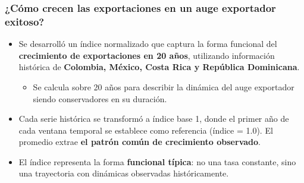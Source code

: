 \documentclass[aspectratio=169,xcolor=dvipsnames]{beamer}
\begin{document}
\begin{frame}
\frametitle{¿Cómo crecen las exportaciones en un auge exportador exitoso?}

\vspace{0.3cm}
\begin{itemize}
    \item Se desarrolló un índice normalizado que captura la forma funcional del \textbf{crecimiento de exportaciones en 20 años}, utilizando información histórica de \textbf{Colombia, México, Costa Rica y República Dominicana}.
    \begin{itemize}
        \item Se calcula sobre 20 años para describir la dinámica del auge exportador siendo conservadores en su duración.
    \end{itemize}
    \item Cada serie histórica se transformó a índice base 1, donde el primer año de cada ventana temporal se establece como referencia (índice = 1.0). El promedio extrae \textbf{el patrón común de crecimiento observado}.
    
    \item El índice representa la forma \textbf{funcional típica}: no una tasa constante, sino una trayectoria con dinámicas observadas históricamente.
\end{itemize}

\end{frame}
\end{document}
